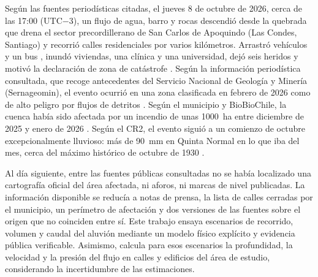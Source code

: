 Según las fuentes periodísticas citadas, el jueves 8 de octubre de 2026, cerca de las 17:00 (UTC$-$3), un flujo de agua, barro y rocas descendió desde la quebrada que drena el sector precordillerano de San Carlos de Apoquindo (Las Condes, Santiago) y recorrió calles residenciales por varios kilómetros. Arrastró vehículos y un bus \citep{theclinic2026frontal}, inundó viviendas, una clínica y una universidad, dejó seis heridos y motivó la declaración de zona de catástrofe \citep{interferencia2026}. Según la información periodística consultada, que recoge antecedentes del Servicio Nacional de Geología y Minería (Sernageomin), el evento ocurrió en una zona clasificada en febrero de 2026 como de alto peligro por flujos de detritos \citep{chilevision2026}. Según el municipio y BioBioChile, la cuenca había sido afectada por un incendio de unas \SI{1000}{ha} entre diciembre de 2025 y enero de 2026 \citep{lascondes2026,biobio2026origen}. Según el CR2, el evento siguió a un comienzo de octubre excepcionalmente lluvioso: más de \SI{90}{mm} en Quinta Normal en lo que iba del mes, cerca del máximo histórico de octubre de 1930 \citep{cr2_2026}.

Al día siguiente, entre las fuentes públicas consultadas no se había localizado una cartografía oficial del área afectada, ni aforos, ni marcas de nivel publicadas. La información disponible se reducía a notas de prensa, la lista de calles cerradas por el municipio, un perímetro de afectación y dos versiones de las fuentes sobre el origen que no coinciden entre sí. Este trabajo ensaya escenarios de recorrido, volumen y caudal del aluvión mediante un modelo físico explícito y evidencia pública verificable. Asimismo, calcula para esos escenarios la profundidad, la velocidad y la presión del flujo en calles y edificios del área de estudio, considerando la incertidumbre de las estimaciones.
